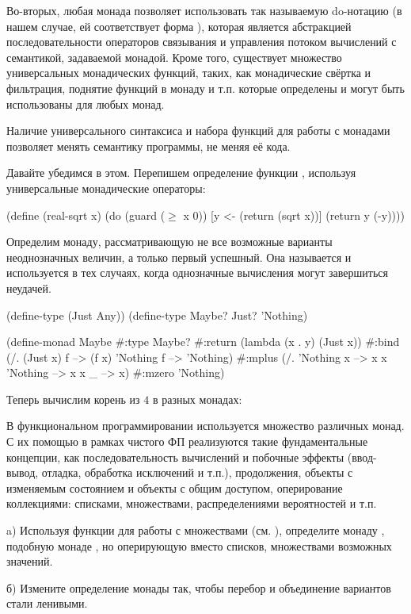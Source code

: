 Во-вторых, любая монада позволяет использовать так называемую do-нотацию (в нашем случае, ей соответствует форма ), которая является абстракцией последовательности операторов связывания и управления потоком вычислений с семантикой, задаваемой монадой. Кроме того, существует множество универсальных монадических функций, таких, как монадические свёртка и фильтрация, поднятие функций в монаду и т.п. которые определены и могут быть использованы для любых монад.

Наличие универсального синтаксиса и набора функций для работы с монадами позволяет менять семантику программы, не меняя её кода.

Давайте убедимся в этом. Перепишем определение функции , используя универсальные монадические операторы:
\begin{SchemeCode}
(define (real-sqrt x)
  (do (guard ($\ge$ x 0))
      [y <- (return (sqrt x))]
      (return y (-y))))
\end{SchemeCode}

Определим монаду, рассматривающую не все возможные варианты неоднозначных величин, а только первый успешный. Она называется  и используется в тех случаях, когда однозначные вычисления могут завершиться неудачей.
\begin{SchemeCode}
(define-type (Just Any))
(define-type Maybe? Just? 'Nothing)

(define-monad Maybe
  #:type Maybe?
  #:return (lambda (x . y) (Just x))
  #:bind   (/. (Just x) f --> (f x)
               'Nothing f --> 'Nothing)
  #:mplus  (/. 'Nothing x --> x
               x 'Nothing --> x
               x _ --> x)
  #:mzero  'Nothing)
\end{SchemeCode}

\noindent
Теперь вычислим корень из $4$ в разных монадах:

В функциональном программировании используется множество различных монад. С их помощью в рамках чистого ФП реализуются такие фундаментальные концепции, как последовательность вычислений и побочные эффекты (ввод-вывод, отладка, обработка исключений и т.п.), продолжения, объекты с изменяемым состоянием и объекты с общим доступом, оперирование коллекциями: списками, множествами, распределениями вероятностей и т.п.

\newpage
\begin{Assignment}
a) Используя функции для работы с множествами (см. ), определите монаду , подобную монаде , но оперирующую вместо списков, множествами возможных значений. 

б) Измените определение монады  так, чтобы перебор и объединение вариантов стали ленивыми.
\end{Assignment}

